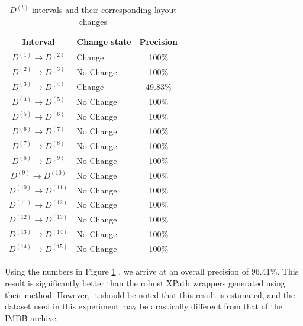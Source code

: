 \begin{table}
\centering
\small
\singlespacing
\begin{tabular}{|c|l|c|}
\hline
	Interval			  & Change state & Precision \\
\hline
	$D^{(1)} \to D^{(2)}$ & Change		& 100\%\\
	$D^{(2)} \to D^{(3)}$ & No Change 	& 100\%\\
	$D^{(3)} \to D^{(4)}$ & Change 		& 49.83\%\\
	$D^{(4)} \to D^{(5)}$ & No Change 	& 100\%\\
	$D^{(5)} \to D^{(6)}$ & No Change 	& 100\%\\
	$D^{(6)} \to D^{(7)}$ & No Change 	& 100\%\\
	$D^{(7)} \to D^{(8)}$ & No Change 	& 100\%\\
	$D^{(8)} \to D^{(9)}$ & No Change 	& 100\%\\
	$D^{(9)} \to D^{(10)}$ & No Change 	& 100\%\\
	$D^{(10)} \to D^{(11)}$ & No Change 	& 100\%\\
	$D^{(11)} \to D^{(12)}$ & No Change 	& 100\%\\
	$D^{(12)} \to D^{(13)}$ & No Change 	& 100\%\\
	$D^{(13)} \to D^{(14)}$ & No Change 	& 100\%\\
	$D^{(14)} \to D^{(15)}$ & No Change 	& 100\%\\
\hline 
\end{tabular}
\caption{$D^{(t)}$ intervals and their corresponding layout changes}
\label{tab:dalvicomp}
\end{table}

Using the numbers in Figure \ref{tab:dalvicomp} , we arrive at an overall precision of 96.41\%. This result
is significantly better than the robust XPath wrappers generated using their method. However,
it should be noted that this result is estimated, and the dataset used in this experiment may
be drastically different from that of the IMDB archive.
